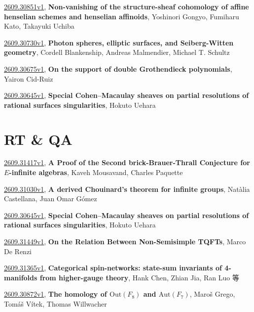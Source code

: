 \documentclass[9pt, a4paper]{article}
\theoremstyle{plain}
\theoremstyle{definition}
\theoremstyle{remark}
\newcommand{\arxiv}[3]{\href{https://arxiv.org/abs/#1}{#1}, \textbf{\textcolor{arxivblue}{#2}}, #3}
\begin{document}
\arxiv{2609.30851v1}{Non-vanishing of the structure-sheaf cohomology of affine henselian schemes and henselian affinoids}{Yoshinori Gongyo, Fumiharu Kato, Takayuki Uchiba}

\arxiv{2609.30730v1}{Photon spheres, elliptic surfaces, and Seiberg-Witten geometry}{Cordell Blankenship, Andreas Malmendier, Michael T. Schultz}

\arxiv{2609.30675v1}{On the support of double Grothendieck polynomials}{Yairon Cid-Ruiz}

\arxiv{2609.30645v1}{Special Cohen--Macaulay sheaves on partial resolutions of rational surfaces singularities}{Hokuto Uehara}


\section{RT \& QA}
\arxiv{2609.31417v1}{A Proof of the Second brick-Brauer-Thrall Conjecture for $E$-infinite algebras}{Kaveh Mousavand, Charles Paquette}

\arxiv{2609.31030v1}{A derived Chouinard's theorem for infinite groups}{Natàlia Castellana, Juan Omar Gómez}

\arxiv{2609.30645v1}{Special Cohen--Macaulay sheaves on partial resolutions of rational surfaces singularities}{Hokuto Uehara}

\arxiv{2609.31449v1}{On the Relation Between Non-Semisimple TQFTs}{Marco De Renzi}

\arxiv{2609.31365v1}{Categorical spin-networks: state-sum invariants of 4-manifolds from higher-gauge theory}{Hank Chen, Zhian Jia, Ran Luo 等}

\arxiv{2609.30872v1}{The homology of $\mathrm{Out}(F_8)$ and $\mathrm{Aut}(F_7)$}{Maroš Grego, Tomáš Vítek, Thomas Willwacher}

\end{document}
